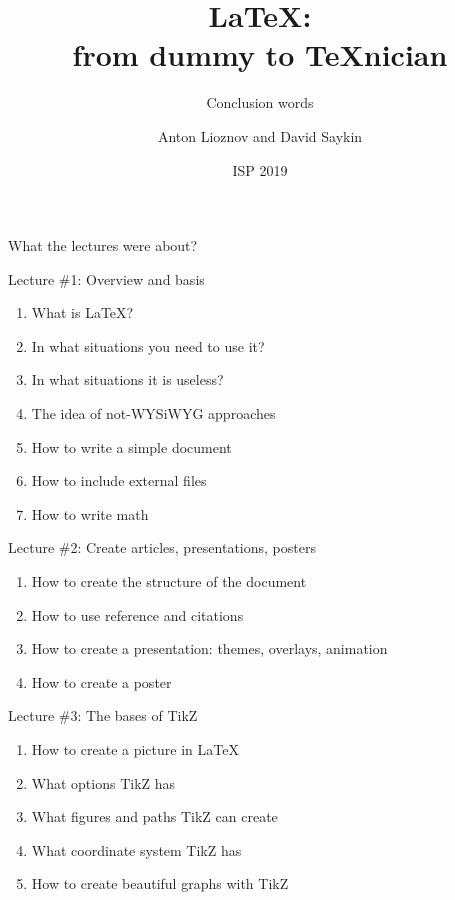 \documentclass[14pt, aspectratio=169]{beamer}
\begin{document}
\title{\LaTeX:\\ \Large from dummy to \TeX nician}
\subtitle{Conclusion words}
\author{Anton Lioznov and David Saykin}
\date{ISP 2019}
\frame{\titlepage}

\begin{frame}\relax
\Huge \centering What the lectures were about?
\end{frame}

\begin{frame}{Lecture \#1: Overview and basis}\relax
\begin{enumerate}
    \item What is \LaTeX?
    \item In what situations you need to use it?
    \item In what situations it is useless?
    \item The idea of not-WYSiWYG approaches
    \item How to write a simple document 
    \item How to include external files 
    \item How to write math
\end{enumerate}
\end{frame}

\begin{frame}{Lecture \#2: Create articles, presentations, posters}\relax

\begin{enumerate}
    \item How to create the structure of the document 
    \item How to use reference and citations
    \item How to create a presentation: themes, overlays, animation
    \item How to create a poster
\end{enumerate}
     
\end{frame}

\begin{frame}{Lecture \#3: The bases of TikZ}\relax

\begin{enumerate}
    \item How to create a picture in \LaTeX 
    \item What options TikZ has 
    \item What figures and paths TikZ can create 
    \item What coordinate system TikZ has 
    \item How to create beautiful graphs with TikZ
\end{enumerate}
     
\end{frame}
\end{document}
